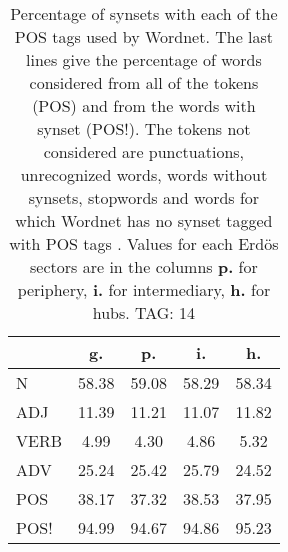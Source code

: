 \begin{table}[h!]
\begin{center}
\begin{tabular}{| l | c | c | c | c |}\hline
 & g. & p. & i. & h. \\\hline
N & 58.38  & 59.08  & 58.29  & 58.34 \\\hline
ADJ & 11.39  & 11.21  & 11.07  & 11.82 \\\hline
VERB & 4.99  & 4.30  & 4.86  & 5.32 \\\hline
ADV & 25.24  & 25.42  & 25.79  & 24.52 \\\hline
POS & 38.17  & 37.32  & 38.53  & 37.95 \\\hline
POS! & 94.99  & 94.67  & 94.86  & 95.23 \\\hline
\end{tabular}
\caption{Percentage of synsets with each of the POS tags used by Wordnet. The last lines give the percentage of words considered from all of the tokens (POS) and from the words with synset (POS!). The tokens not considered are punctuations, unrecognized words, words without synsets, stopwords and words for which Wordnet has no synset  tagged with POS tags . Values for each Erd\"os sectors are in the columns {{\bf p.}} for periphery, {{\bf i.}} for intermediary, {{\bf h.}} for hubs. TAG: 14}
\end{center}
\end{table}